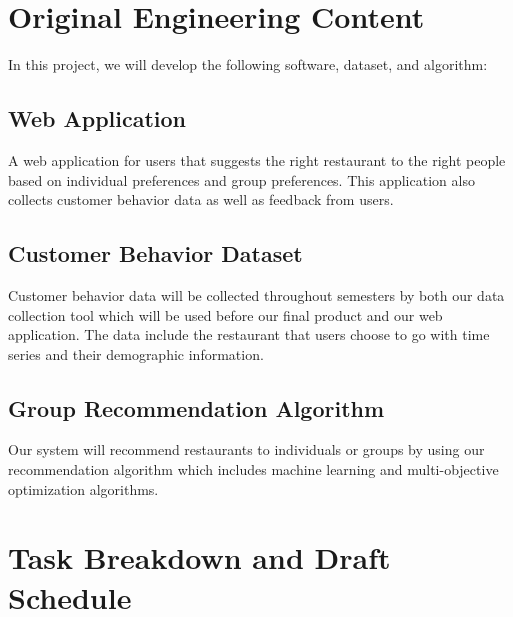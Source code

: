 \documentclass[12pt,oneside,openright,a4paper]{cpe-english-project}
\begin{document}
\section{Original Engineering Content} 
In this project, we will develop the following software, dataset, and algorithm:

\subsection{Web Application} 
A web application for users that suggests the right restaurant to the right people based on individual preferences and group preferences. This application also collects customer behavior data as well as feedback from users.

\subsection{Customer Behavior Dataset} 
Customer behavior data will be collected throughout semesters by both our data collection tool which will be used before our final product and our web application. The data include the restaurant that users choose to go with time series and their demographic information.

\subsection{Group Recommendation Algorithm} 
Our system will recommend restaurants to individuals or groups by using our recommendation algorithm which includes machine learning and multi-objective optimization algorithms.


\section{Task Breakdown and Draft Schedule}
\end{document}
